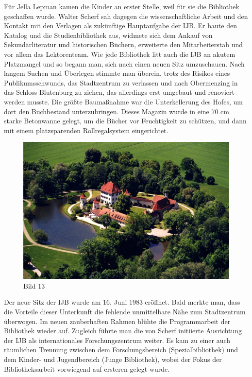 \documentclass[a4paper,
fontsize=11pt,
oneside,
numbers=noperiodatend,
parskip=half-,
bibliography=totoc,
final
]{scrartcl}
\begin{document}
Für Jella Lepman kamen die Kinder an erster Stelle, weil für sie die
Bibliothek geschaffen wurde. Walter Scherf sah dagegen die
wissenschaftliche Arbeit und den Kontakt mit den Verlagen als zukünftige
Hauptaufgabe der IJB. Er baute den Katalog und die Studienbibliothek
aus, widmete sich dem Ankauf von Sekundärliteratur und historischen
Büchern, erweiterte den Mitarbeiterstab und vor allem das Lektorenteam.
Wie jede Bibliothek litt auch die IJB an akutem Platzmangel und so
begann man, sich nach einen neuen Sitz umzuschauen. Nach langem Suchen
und Überlegen stimmte man überein, trotz des Risikos eines
Publikumsschwunds, das Stadtzentrum zu verlassen und nach Obermenzing in
das Schloss Blutenburg zu ziehen, das allerdings erst umgebaut und
renoviert werden musste. Die größte Baumaßnahme war die Unterkellerung
des Hofes, um dort den Buchbestand unterzubringen. Dieses Magazin wurde
in eine 70 cm starke Betonwanne gelegt, um die Bücher vor Feuchtigkeit
zu schützen, und dann mit einem platzsparenden Rollregalsystem
eingerichtet.

\begin{figure}[htbp]
\centering
\includegraphics{img/Bild13.jpg}
\caption{Bild 13}
\end{figure}

Der neue Sitz der IJB wurde am 16. Juni 1983 eröffnet. Bald merkte man,
dass die Vorteile dieser Unterkunft die fehlende unmittelbare Nähe zum
Stadtzentrum überwogen. Im neuen zauberhaften Rahmen blühte die
Programmarbeit der Bibliothek wieder auf. Zugleich führte man die von
Scherf initiierte Ausrichtung der IJB als internationales
Forschungszentrum weiter. Es kam zu einer auch räumlichen Trennung
zwischen dem Forschungsbereich (Spezialbibliothek) und dem Kinder- und
Jugendbereich (Junge Bibliothek), wobei der Fokus der Bibliotheksarbeit
vorwiegend auf ersteren gelegt wurde.
\end{document}
